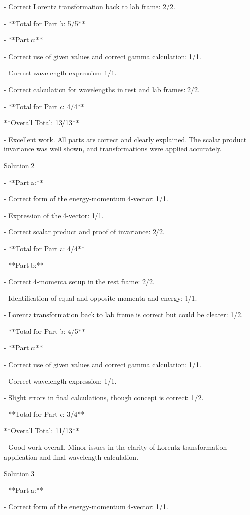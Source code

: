 \documentclass[a4paper,11pt]{article}
\begin{document}
  - Correct Lorentz transformation back to lab frame: 2/2.
  
  - **Total for Part b: 5/5**

- **Part c:**

  - Correct use of given values and correct gamma calculation: 1/1.
  
  - Correct wavelength expression: 1/1.
  
  - Correct calculation for wavelengths in rest and lab frames: 2/2.
  
  - **Total for Part c: 4/4**

**Overall Total: 13/13**

- Excellent work. All parts are correct and clearly explained. The scalar product invariance was well shown, and transformations were applied accurately.

Solution 2

- **Part a:**

  - Correct form of the energy-momentum 4-vector: 1/1.
  
  - Expression of the 4-vector: 1/1.
  
  - Correct scalar product and proof of invariance: 2/2.
  
  - **Total for Part a: 4/4**

- **Part b:**

  - Correct 4-momenta setup in the rest frame: 2/2.
  
  - Identification of equal and opposite momenta and energy: 1/1.
  
  - Lorentz transformation back to lab frame is correct but could be clearer: 1/2.
  
  - **Total for Part b: 4/5**

- **Part c:**

  - Correct use of given values and correct gamma calculation: 1/1.
  
  - Correct wavelength expression: 1/1.
  
  - Slight errors in final calculations, though concept is correct: 1/2.
  
  - **Total for Part c: 3/4**

**Overall Total: 11/13**

- Good work overall. Minor issues in the clarity of Lorentz transformation application and final wavelength calculation.

Solution 3

- **Part a:**

  - Correct form of the energy-momentum 4-vector: 1/1.
  
\end{document}
